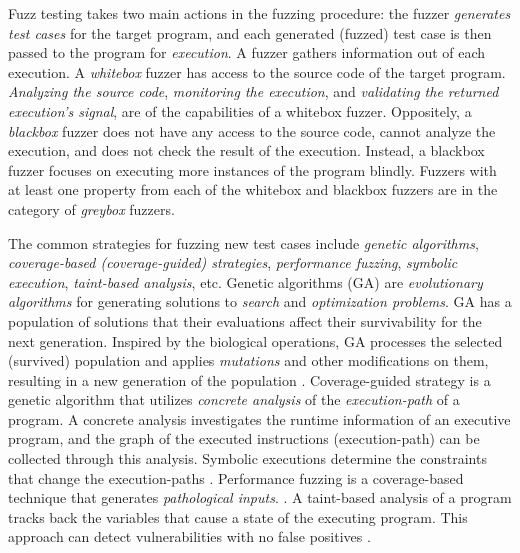 Fuzz testing takes two main actions in the fuzzing procedure: the fuzzer \textit{generates test cases} for the target program, and each generated (fuzzed) test case is then passed to the program for \textit{execution}. A fuzzer gathers information out of each execution. A \textit{whitebox} fuzzer has access to the source code of the target program. \textit{Analyzing the source code}, \textit{monitoring the execution}, and \textit{validating the returned execution's signal}, are of the capabilities of a whitebox fuzzer. Oppositely, a \textit{blackbox} fuzzer does not have any access to the source code, cannot analyze the execution, and does not check the result of the execution. Instead, a blackbox fuzzer focuses on executing more instances of the program blindly. Fuzzers with at least one property from each of the whitebox and blackbox fuzzers are in the category of \textit{greybox} fuzzers.

The common strategies for fuzzing new test cases include \textit{genetic algorithms}, \textit{coverage-based (coverage-guided) strategies}, \textit{performance fuzzing}, \textit{symbolic execution}, \textit{taint-based analysis}, etc. Genetic algorithms (GA) are \textit{evolutionary algorithms} for generating solutions to \textit{search} and \textit{optimization problems}. GA has a population of solutions that their evaluations affect their survivability for the next generation. Inspired by the biological operations, GA processes the selected (survived) population and applies \textit{mutations} and other modifications on them, resulting in a new generation of the population \cite{banzhaf1998genetic, whitley1994genetic}. Coverage-guided strategy is a genetic algorithm that utilizes \textit{concrete analysis} of the \textit{execution-path} of a program. A concrete analysis investigates the runtime information of an executive program, and the graph of the executed instructions (execution-path) can be collected through this analysis. Symbolic executions determine the constraints that change the execution-paths \cite{bohme2017coverage}. Performance fuzzing is a coverage-based technique that generates \textit{pathological inputs}.  \cite{lemieux2018perffuzz}. A taint-based analysis of a program tracks back the variables that cause a state of the executing program. This approach can detect vulnerabilities with no false positives \cite{newsome2005dynamic}. 

